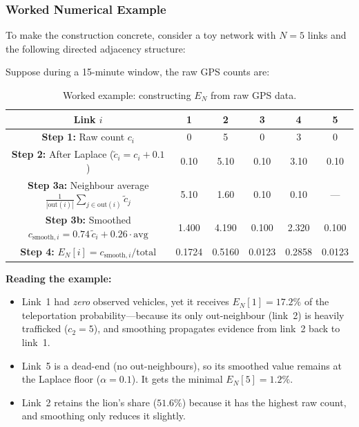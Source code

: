 \documentclass[12pt,a4paper]{article}
\theoremstyle{definition}
\theoremstyle{plain}
\begin{document}
\subsubsection{Worked Numerical Example}

To make the construction concrete, consider a toy network with $N = 5$ links and
the following directed adjacency structure:

\begin{center}
\end{center}

\noindent
Suppose during a 15-minute window, the raw GPS counts are:

\begin{table}[H]
  \centering
  \small
  \caption{Worked example: constructing $E_N$ from raw GPS data.}
  \label{tab:teleport_example}
  \begin{tabular}{@{}c c c c c c@{}}
    \toprule
    Link $i$ & 1 & 2 & 3 & 4 & 5\\
    \midrule
    \textbf{Step 1:} Raw count $c_i$
      & 0 & 5 & 0 & 3 & 0\\[4pt]
    \textbf{Step 2:} After Laplace ($\tilde{c}_i = c_i + 0.1$)
      & 0.10 & 5.10 & 0.10 & 3.10 & 0.10\\[4pt]
    \textbf{Step 3a:} Neighbour average
      $\frac{1}{|\text{out}(i)|}\sum_{j \in \text{out}(i)} \tilde{c}_j$
      & 5.10 & 1.60 & 0.10 & 0.10 & ---\\[4pt]
    \textbf{Step 3b:} Smoothed
      $c_{\text{smooth},i} = 0.74\,\tilde{c}_i + 0.26 \cdot \text{avg}$
      & 1.400 & 4.190 & 0.100 & 2.320 & 0.100\\[4pt]
    \textbf{Step 4:} $E_N[i] = c_{\text{smooth},i}/\text{total}$
      & 0.1724 & 0.5160 & 0.0123 & 0.2858 & 0.0123\\
    \bottomrule
  \end{tabular}
\end{table}

\noindent
\textbf{Reading the example:}
\begin{itemize}
  \item Link~1 had \emph{zero} observed vehicles, yet it receives
    $E_N[1] = 17.2\%$ of the teleportation probability---because its only
    out-neighbour (link~2) is heavily trafficked ($c_2 = 5$), and smoothing
    propagates evidence from link~2 back to link~1.
  \item Link~5 is a dead-end (no out-neighbours), so its smoothed value remains
    at the Laplace floor ($\alpha = 0.1$). It gets the minimal
    $E_N[5] = 1.2\%$.
  \item Link~2 retains the lion's share ($51.6\%$) because it has the highest
    raw count, and smoothing only reduces it slightly.
\end{itemize}
\end{document}
